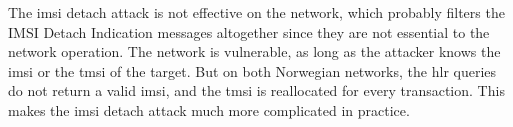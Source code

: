       The \gls{imsi} detach attack is not effective on the 
      network, which probably filters the IMSI Detach Indication
      messages altogether since they are not essential to the network
      operation. The  network is vulnerable, as long as
      the attacker knows the \gls{imsi} or the \gls{tmsi} of the target.
      But on both Norwegian networks, the \gls{hlr} queries do not
      return a valid \gls{imsi}, and the \gls{tmsi} is reallocated for
      every transaction. This makes the \gls{imsi} detach attack much
      more complicated in practice.

